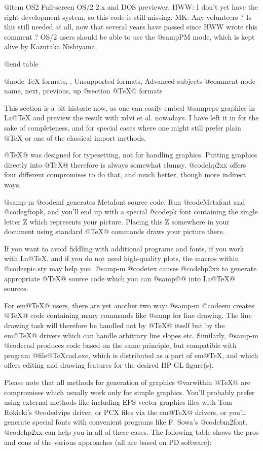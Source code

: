 @item OS2
	Full-screen OS/2 2.x and DOS previewer. HWW: I don't yet have the
	right development system, so this code is still missing.
	MK: Any volunteers ? Is this still needed at all, now that several
	years have passed since HWW wrote this comment ? OS/2 users should
	be able to use the @samp{PM} mode, which is kept alive by Kazutaka
	Nishiyama.
		
@end table




@node TeX formats, , Unsupported formats, Advanced subjects
@comment  node-name,  next,  previous,  up
@section @TeX{}@  formats

This section is a bit historic now, as one can easily embed @samp{eps}
graphics in La@TeX{} and preview the result with xdvi et al. nowadays.
I have left it in for the sake of completeness, and for special cases
where one might still prefer plain @TeX{} or one of the classical import
methods.

@TeX{}@  was designed for typesetting, not for handling graphics. Putting
graphics directly into @TeX{}@  therefore is always somewhat clumsy.
@code{hp2xx} offers four different compromises to do that, and much
better, though more indirect ways.

@samp{-m @code{mf}} generates Metafont source code. Run @code{Metafont}
and @code{gftopk}, and you'll end up with a special @code{pk} font
containing the single letter Z which represents your picture. Placing
this Z somewhere in your document using standard @TeX{}@  commands
draws your picture there.

If you want to avoid fiddling with additional programs and fonts, if you
work with La@TeX{}, and if you do not need high-quality plots,
the macros within @code{epic.sty} may help you.
@samp{-m @code{tex}} causes @code{hp2xx} to generate
appropriate @TeX{}@ source code which you can @samp{@{@}} into
La@TeX{}@ sources.

For em@TeX{}@ users, there are yet another two way: @samp{-m @code{em}}
creates @TeX{}@ code containing many commands like @samp{}
for line drawing. The line drawing task will therefore be handled not by
@TeX{}@ itself but by the em@TeX{}@ drivers which can handle arbitrary
line slopes etc. Similarly, @samp{-m @code{cad}} produces code based on
the same principle, but compatible with program @file{@TeX{}cad.exe}, which is
distributed as a part of em@TeX{}, and which offers editing and drawing
features for the desired HP-GL figure(s).

Please note that all methods for generation of graphics @var{within}
@TeX{}@ are compromises which usually work only for simple graphics.
You'll probably prefer using external methods like including EPS vector
graphics files with Tom Rokicki's @code{dvips} driver, or PCX files via the
em@TeX{}@ drivers, or you'll generate special fonts with convenient
programs like F. Sowa's @code{bm2font}. @code{hp2xx} can help you in all
of these cases. The following table shows the pros and cons of the
various approaches (all are based on PD software):

